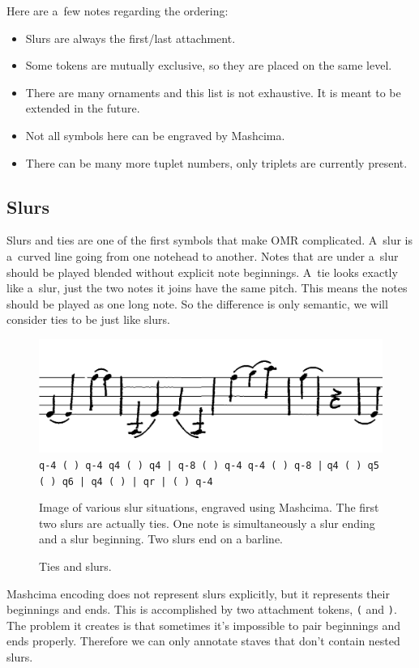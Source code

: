 Here are a~few notes regarding the ordering:

\begin{itemize}
\item Slurs are always the first/last attachment.
\item Some tokens are mutually exclusive, so they are placed on the same level.
\item There are many ornaments and this list is not exhaustive. It is meant to be extended in the future.
\item Not all symbols here can be engraved by Mashcima.
\item There can be many more tuplet numbers, only triplets are currently present.
\end{itemize}


\subsection{Slurs}
\label{sec:RepresentationSlurs}

Slurs and ties are one of the first symbols that make OMR complicated. A~slur is a~curved line going from one notehead to another. Notes that are under a~slur should be played blended without explicit note beginnings. A~tie looks exactly like a~slur, just the two notes it joins have the same pitch. This means the notes should be played as one long note. So the difference is only semantic, we will consider ties to be just like slurs.

\begin{figure}[h]
    \centering
    \includegraphics[width=140mm]{../img/slurs}
    \verb`q-4 ( ) q-4 q4 ( ) q4 | q-8 ( ) q-4 q-4 ( ) q-8 |`
    \verb`q4 ( ) q5 ( ) q6 | q4 ( ) | qr | ( ) q-4`
    \caption{Ties and slurs.}
    \label{fig4:Slurs}
    \medskip
    \small
    Image of various slur situations, engraved using Mashcima. The first two slurs are actually ties. One note is simultaneously a slur ending and a slur beginning. Two slurs end on a barline.
\end{figure}

Mashcima encoding does not represent slurs explicitly, but it represents their beginnings and ends. This is accomplished by two attachment tokens, \verb`(` and \verb`)`. The problem it creates is that sometimes it's impossible to pair beginnings and ends properly. Therefore we can only annotate staves that don't contain nested slurs.


